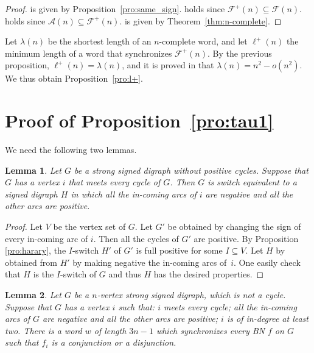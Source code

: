 \documentclass[11pt,letter]{article}
\newtheorem{lemma}{Lemma}
\newcommand{\BF}[1]{{{\boldmath{\bf #1}\unboldmath}}}
\begin{document}
\begin{proof}
\BF{($1 \Rightarrow 2$)} is given by Proposition~\ref{pro:same_sign}. \BF{($2 \Rightarrow 3$)} holds since $\mathcal{F}^+(n)\subseteq \mathcal{F}(n)$. \BF{($3 \Rightarrow 4$)} holds since $\mathcal{A}(n)\subseteq \mathcal{F}^+(n)$. \BF{($4 \Rightarrow 1$)} is given by Theorem~\ref{thm:n-complete}.
\end{proof} 

Let $\lambda(n)$ be the shortest length of an $n$-complete word, and let $\ell^+(n)$ the minimum length of a word that synchronizes $\mathcal{F}^+(n)$. By the previous proposition, $\ell^+(n)=\lambda(n)$, and it is proved in \cite{KK76} that $\lambda(n)=n^2-o(n^2)$. We thus obtain Proposition~\ref{pro:l+}. 

\section{Proof of Proposition~\ref{pro:tau1}}\label{app:tau1}

We need the following two lemmas. 

\begin{lemma}\label{lem:tau11}
Let $G$ be a strong signed digraph without positive cycles. Suppose that $G$ has a vertex $i$ that meets every cycle of $G$. Then $G$ is switch equivalent to a signed digraph $H$ in which all the in-coming arcs of $i$ are negative and all the other arcs are positive. 
\end{lemma}

\begin{proof}
Let $V$ be the vertex set of $G$. Let $G'$ be obtained by changing the sign of every in-coming arc of $i$. Then all the cycles of $G'$ are positive. By Proposition \ref{pro:harary}, the $I$-switch $H'$ of $G'$ is full positive for some $I\subseteq V$. Let $H$ by obtained from $H'$ by making negative the in-coming arcs of~$i$. One easily check that $H$ is the $I$-switch of $G$ and thus $H$ has the desired properties.
\end{proof}

\begin{lemma}\label{lem:tau12}
Let $G$ be a $n$-vertex strong signed digraph, which is not a cycle. Suppose that $G$ has a vertex $i$ such that: $i$ meets every cycle; all the in-coming arcs of $G$ are negative and all the other arcs are positive; $i$ is of in-degree at least two. There is a word $w$ of length $3n-1$ which synchronizes every BN $f$ on $G$ such that $f_i$ is a conjunction or a disjunction. 
\end{lemma}
\end{document}
